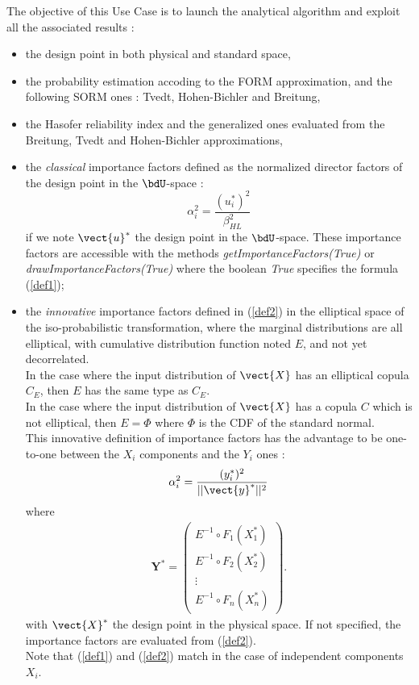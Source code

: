 The objective of this Use Case is to launch the analytical algorithm and exploit all the associated results :
\begin{itemize}
\item the design point in both physical and standard space,
\item the probability estimation accoding to the FORM approximation, and the following SORM ones : Tvedt, Hohen-Bichler and Breitung,
\item the Hasofer reliability index and the generalized ones evaluated from the Breitung, Tvedt and Hohen-Bichler approximations,
\item the \emph{classical} importance factors defined as the normalized director factors of the design point in the $\bdU$-space  :
  \begin{equation}\label{def1}
    \alpha_i^2 = \displaystyle \frac{(u_i^{*})^2}{\beta_{HL}^2}
  \end{equation}
  if we note $\vect{u}^*$ the design point in the $\bdU$-space. These importance factors are accessible with the methods \emph{getImportanceFactors(True)} or  \emph{drawImportanceFactors(True)} where the boolean \textit{True} specifies the formula (\ref{def1});
\item the \emph{innovative} importance factors defined in (\ref{def2}) in the elliptical space of the iso-probabilistic transformation, where the marginal distributions are all elliptical, with cumulative distribution function noted $E$, and not yet decorrelated.\\
  In the case where the input distribution of $\vect{X}$ has an elliptical copula $C_E$, then $E$ has the same type as  $C_E$.\\
  In the case where the input distribution of $\vect{X}$ has a copula $C$ which is not elliptical, then  $E=\Phi$ where $\Phi$ is the CDF of the standard normal.\\
  This innovative definition of importance factors has the advantage to be one-to-one between the $X_i$ components and the $Y_i$ ones :
  \begin{equation}\label{def2}
    \alpha_i^2 = \displaystyle \frac{(y_i^{*})^2}{||\vect{y}^{*}||^2}
  \end{equation}
  where
  \begin{eqnarray}
    \boldsymbol{Y}^* =  \left(
    \begin{array}{c}
      E^{-1}\circ F_1(X_1^*) \\
      E^{-1}\circ F_2(X_2^*) \\
      \vdots \\
      E^{-1}\circ F_n(X_n^*)
    \end{array}
    \right).\label{varY10}
  \end{eqnarray}
  with $\vect{X}^*$ the design point in the physical space. If not specified, the importance factors are evaluated from (\ref{def2}).\\
  Note that (\ref{def1}) and (\ref{def2}) match in the case of independent components $X_i$.


\end{itemize}
